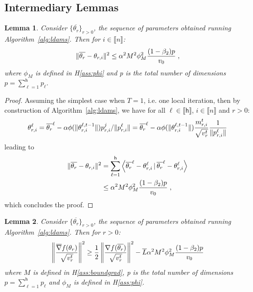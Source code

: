 \documentclass[11pt]{article}
\newtheorem*{Lemma*}{Lemma}
\newcommand{\eqsp}{\;}
\newcommand{\beq}{\begin{equation}}
\newcommand{\eeq}{\end{equation}}
\newcommand{\pscal}[2]{\left\langle#1\,|\,#2 \right\rangle}
\newcommand{\inter}{\llbracket n \rrbracket}
\def\tot{\mathsf{h}}
\begin{document}
\subsection{Intermediary Lemmas}


\begin{Lemma*}
Consider $\{\overline{\theta_r}\}_{r>0}$, the sequence of parameters obtained running Algorithm~\ref{alg:ldams}. Then for $i \in \inter$:
\beq\notag
\| \overline{\theta_r} - \theta_{r,i} \|^2 \leq \alpha^2 M^2 \phi_M^2 \frac{(1-\beta_2)p}{v_0} \eqsp,
\eeq
where $\phi_M$ is defined in H\ref{ass:phi} and p is the total number of dimensions $p = \sum_{\ell = 1}^\tot p_\ell$.
\end{Lemma*}

\begin{proof}
Assuming the simplest case when $T=1$, i.e. one local iteration, then by construction of Algorithm~\ref{alg:ldams}, we have for all $\ell \in \llbracket \tot \rrbracket$, $i \in \inter$ and $r >0$:
\beq\notag
 \theta^{\ell}_{r,i} =  \overline{\theta_r}^{\ell}  - \alpha \phi(\|\theta_{r,i}^{\ell,t-1}\|)p_{r,i}^{j} / \|p_{r,i}^{\ell}\|=  \overline{\theta_r}^{\ell}  - \alpha \phi(\|\theta_{r,i}^{\ell,t-1}\|)  
 \frac{m^{t}_{r,i}}{\sqrt{v^{t}_{r}}} \frac{1}{\|p_{r,i}^{\ell}\|}
\eeq
leading to 
\beq\notag
\begin{split}
\|\overline{\theta_r}   -  \theta_{r,i}\|^2 & = \sum_{\ell=1}^\tot \pscal{\overline{\theta_r}^{\ell}   -  \theta^{\ell}_{r,i}}{\overline{\theta_r}^{\ell}   -  \theta^{\ell}_{r,i}} \\
& \leq \alpha^2 M^2 \phi_M^2 \frac{(1-\beta_2)p}{v_0} \eqsp,
\end{split}
\eeq
which concludes the proof.
\end{proof}



\begin{Lemma*}
Consider $\{\overline{\theta_r}\}_{r>0}$, the sequence of parameters obtained running Algorithm~\ref{alg:ldams}. Then for $r > 0$:
\beq\notag
\left\| \frac{\overline{\nabla}f(\theta_r)}{\sqrt{ v_r^t}} \right\|^2 \geq \frac{1}{2} \left\| \frac{\nabla f(\overline{\theta_r})}{\sqrt{ v_r^t}} \right\|^2 - \overline{L} \alpha^2 M^2 \phi_M^2 \frac{(1-\beta_2)p}{v_0}
\eeq
where $M$ is defined in H\ref{ass:boundgrad}, p is the total number of dimensions $p = \sum_{\ell = 1}^\tot p_\ell$ and $\phi_M$ is defined in H\ref{ass:phi}.
\end{Lemma*}
\end{document}
